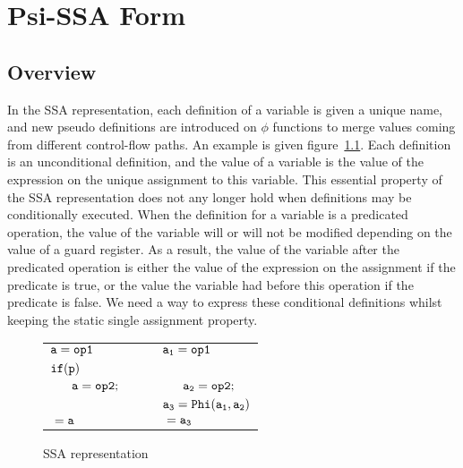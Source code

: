 \chapter{Psi-SSA Form }

\section{Overview}



In the SSA representation, each definition of a variable is given a
unique name, and new pseudo definitions are introduced on $\phi$
functions to merge values coming from different control-flow paths. An
example is given figure~\ref{fig:op_ssa}. Each definition is an
unconditional definition, and the value of a variable is the value of
the expression on the unique assignment to this variable. This
essential property of the SSA representation does not any longer hold
when definitions may be conditionally executed. When the definition
for a variable is a predicated operation, the value of the variable
will or will not be modified depending on the value of a guard
register. As a result, the value of the variable after the predicated
operation is either the value of the expression on the assignment if
the predicate is true, or the value the variable had before this
operation if the predicate is false. We need a way to express these
conditional definitions whilst keeping the static single assignment
property.

\begin{figure}
\begin{center}
\footnotesize
\begin{tabular}{llll}
${\tt a = op1}$ & & & ${\tt a_1 = op1}$ \\
${\tt if (p)}$        & & & \\
${\tt\ \ \ \ \ a = op2;}$ & & & ${\tt \ \ \ \ \ a_2 = op2;}$ \\
& & & ${\tt a_3 = Phi(a_1, a_2)}$ \\
${\tt \ = a}$ & & & ${\tt \ = a_3}$ \\
\end{tabular}
\caption{SSA representation}
\label{fig:op_ssa}
\end{center}
\end{figure}

